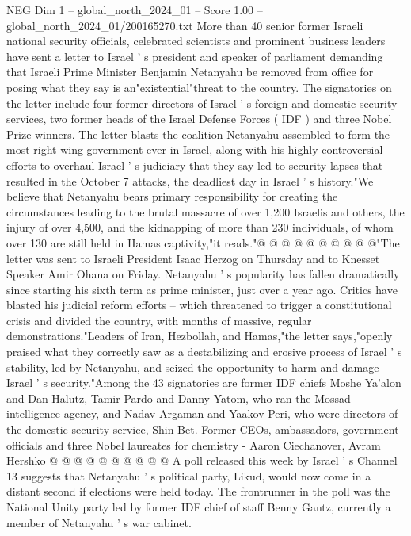 \begin{textsample}{NEG Dim 1 – global\_north\_2024\_01 – Score 1.00 – global\_north\_2024\_01/200165270.txt}  \label{ex:f1_neg_293}
More than 40 senior former Israeli national security officials, celebrated scientists and prominent business leaders have sent a letter to Israel ' s president and speaker of parliament demanding that Israeli Prime Minister Benjamin Netanyahu be removed from office for posing what they say is an"existential"threat to the country.
The signatories on the letter include four former directors of Israel ' s foreign and domestic security services, two former heads of the Israel Defense Forces ( IDF ) and three Nobel Prize winners.
The letter blasts the coalition Netanyahu assembled to form the most right-wing government ever in Israel, along with his highly controversial efforts to overhaul Israel ' s judiciary that they say led to security lapses that resulted in the October 7 attacks, the deadliest day in Israel ' s history."We believe that Netanyahu bears primary responsibility for creating the circumstances leading to the brutal massacre of over 1,200 Israelis and others, the injury of over 4,500, and the kidnapping of more than 230 individuals, of whom over 130 are still held in Hamas captivity,"it reads."@ @ @ @ @ @ @ @ @ @"The letter was sent to Israeli President Isaac Herzog on Thursday and to Knesset Speaker Amir Ohana on Friday.
Netanyahu ' s popularity has fallen dramatically since starting his sixth term as prime minister, just over a year ago.
Critics have blasted his judicial reform efforts -- which threatened to trigger a constitutional crisis and divided the country, with months of massive, regular demonstrations."Leaders of Iran, Hezbollah, and Hamas,"the letter says,"openly praised what they correctly saw as a destabilizing and erosive process of Israel ' s stability, led by Netanyahu, and seized the opportunity to harm and damage Israel ' s security."Among the 43 signatories are former IDF chiefs Moshe Ya'alon and Dan Halutz, Tamir Pardo and Danny Yatom, who ran the Mossad intelligence agency, and Nadav Argaman and Yaakov Peri, who were directors of the domestic security service, Shin Bet.
Former CEOs, ambassadors, government officials and three Nobel laureates for chemistry - Aaron Ciechanover, Avram Hershko @ @ @ @ @ @ @ @ @ @ A poll released this week by Israel ' s Channel 13 suggests that Netanyahu ' s political party, Likud, would now come in a distant second if elections were held today.
The frontrunner in the poll was the National Unity party led by former IDF chief of staff Benny Gantz, currently a member of Netanyahu ' s war cabinet.

\end{textsample}
